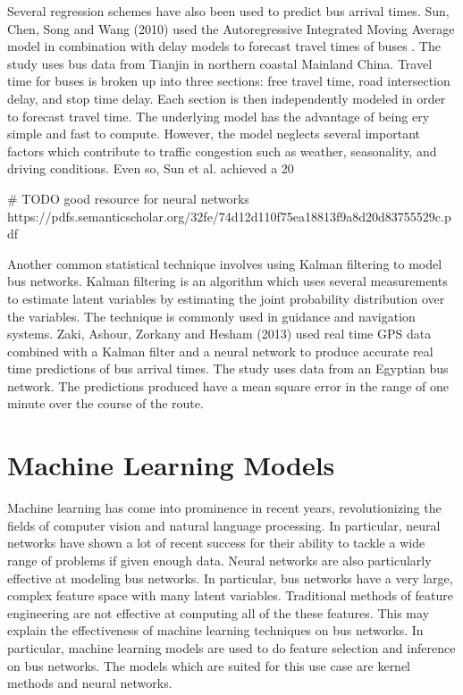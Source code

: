Several regression schemes have also been used to predict bus arrival times.
Sun, Chen, Song and Wang (2010) used the Autoregressive Integrated Moving Average model in combination with delay models to forecast travel times of buses \cite{sun2010bus}.
The study uses bus data from Tianjin in northern coastal Mainland China.
Travel time for buses is broken up into three sections: free travel time, road intersection delay, and stop time delay.
Each section is then independently modeled in order to forecast travel time.
The underlying model has the advantage of being ery simple and fast to compute.
However, the model neglects several important factors which contribute to traffic congestion such as weather, seasonality, and driving conditions.
Even so, Sun et al. achieved a 20%

# TODO good resource for neural networks https://pdfs.semanticscholar.org/32fe/74d12d110f75ea18813f9a8d20d83755529c.pdf

Another common statistical technique involves using Kalman filtering to model bus networks.
Kalman filtering is an algorithm which uses several measurements to estimate latent variables by estimating the joint probability distribution over the variables.
The technique is commonly used in guidance and navigation systems.
Zaki, Ashour, Zorkany and Hesham (2013) used real time GPS data combined with a Kalman filter and a neural network to produce accurate real time predictions of bus arrival times\cite{zaki2013online}.
The study uses data from an Egyptian bus network.
The predictions produced have a mean square error in the range of one minute over the course of the route.


\section{Machine Learning Models}

Machine learning has come into prominence in recent years, revolutionizing the fields of computer vision and natural language processing.
In particular, neural networks have shown a lot of recent success for their ability to tackle a wide range of problems if given enough data.
Neural networks are also particularly effective at modeling bus networks.
In particular, bus networks have a very large, complex feature space with many latent variables.
Traditional methods of feature engineering are not effective at computing all of the these features.
This may explain the effectiveness of machine learning techniques on bus networks.
In particular, machine learning models are used to do feature selection and inference on bus networks.
The models which are suited for this use case are kernel methods and neural networks.

